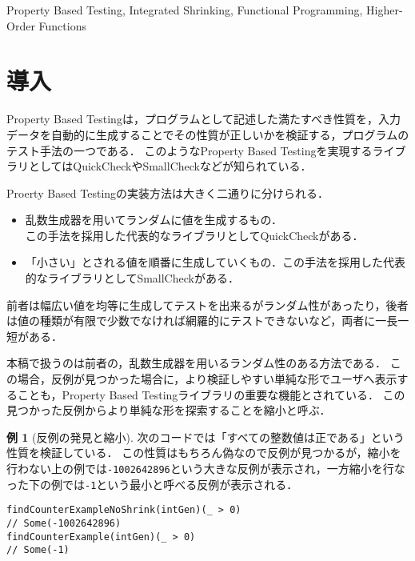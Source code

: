 \documentclass[submit,PRO]{ipsj}
\theoremstyle{definition}
\newtheorem{example}{例}
\begin{document}
\begin{ekeyword}
  Property Based Testing, Integrated Shrinking, Functional Programming, Higher-Order Functions
\end{ekeyword}

\maketitle

\section{導入}

Property Based Testingは，プログラムとして記述した満たすべき性質を，入力データを自動的に生成することでその性質が正しいかを検証する，プログラムのテスト手法の一つである．
このようなProperty Based Testingを実現するライブラリとしてはQuickCheck\cite{claessen_quickcheck_2011}やSmallCheck\cite{runciman_smallcheck_2008}などが知られている．

Proerty Based Testingの実装方法は大きく二通りに分けられる．

\begin{itemize}
  \item 乱数生成器を用いてランダムに値を生成するもの．\\この手法を採用した代表的なライブラリとしてQuickCheckがある．
  \item 「小さい」とされる値を順番に生成していくもの．この手法を採用した代表的なライブラリとしてSmallCheckがある．
\end{itemize}

前者は幅広い値を均等に生成してテストを出来るがランダム性があったり，後者は値の種類が有限で少数でなければ網羅的にテストできないなど，両者に一長一短がある．

本稿で扱うのは前者の，乱数生成器を用いるランダム性のある方法である．
この場合，反例が見つかった場合に，より検証しやすい単純な形でユーザへ表示することも，Property Based Testingライブラリの重要な機能とされている．
この見つかった反例からより単純な形を探索することを縮小と呼ぶ．

\begin{example}[反例の発見と縮小]
次のコードでは「すべての整数値は正である」という性質を検証している．
この性質はもちろん偽なので反例が見つかるが，縮小を行わない上の例では\texttt{-1002642896}という大きな反例が表示され，一方縮小を行なった下の例では\texttt{-1}という最小と呼べる反例が表示される．

\begin{verbatim}
findCounterExampleNoShrink(intGen)(_ > 0)
// Some(-1002642896)
findCounterExample(intGen)(_ > 0)
// Some(-1)
\end{verbatim}
\end{example}
\end{document}
